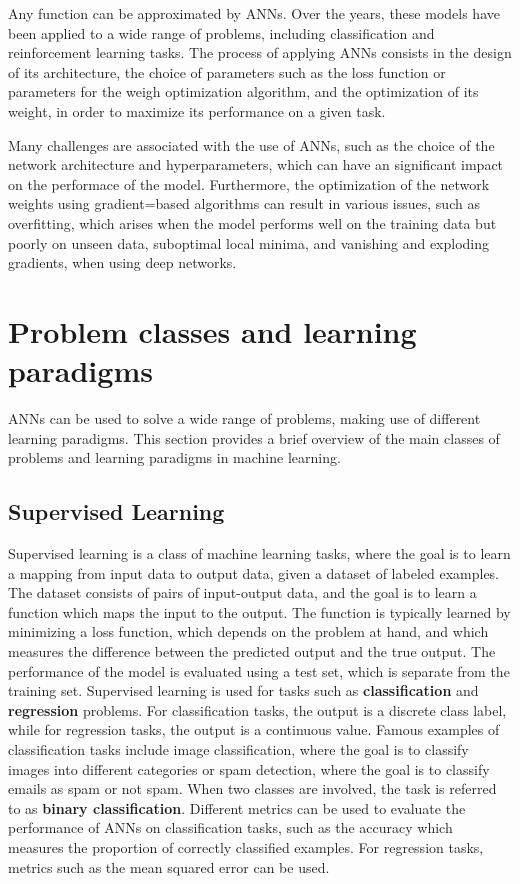 Any function can be approximated by ANNs. Over the years, these models have been applied to a wide range of problems, including classification and reinforcement
learning tasks. The process of applying ANNs consists in the design of its architecture, the choice of parameters such as the loss function or parameters for the
weigh optimization algorithm, and the optimization of its weight, in order to maximize its performance on a given task.

Many challenges are associated with the use of ANNs, such as the choice of the network architecture and hyperparameters, which can have an significant
impact on the performace of the model. Furthermore, the optimization of the network weights using gradient=based algorithms can result in various issues, such
as overfitting, which arises when the model performs well on the training data but poorly on unseen data, suboptimal local minima, and vanishing and
exploding gradients, when using deep networks.

\section{Problem classes and learning paradigms}

ANNs can be used to solve a wide range of problems, making use of different learning paradigms. This section provides a brief overview of the main classes of
problems and learning paradigms in machine learning.

\subsection{Supervised Learning}

Supervised learning is a class of machine learning tasks, where the goal is to learn a mapping from input data to output data, given a dataset of labeled
examples. The dataset consists of pairs of input-output data, and the goal is to learn a function which maps the input to the output. The function is typically
learned by minimizing a loss function, which depends on the problem at hand, and which measures the difference between the predicted output and the true output.
The performance of the model is evaluated using a test set, which is separate from the training set. Supervised learning is used for tasks such as \textbf{classification}
and \textbf{regression} problems. For classification tasks, the output is a discrete class label, while for regression tasks, the output is a continuous value.
Famous examples of classification tasks include image classification, where the goal is to classify images into different categories or spam detection, where
the goal is to classify emails as spam or not spam. When two classes are involved, the task is referred to as \textbf{binary classification}.
Different metrics can be used to evaluate the performance of ANNs on classification tasks, such as the accuracy which measures the proportion of correctly
classified examples. For regression tasks, metrics such as the mean squared error can be used.

